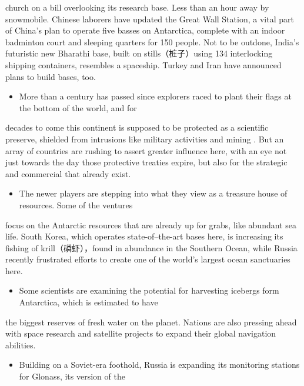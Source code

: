 \documentclass[UTF8,11pt]{ctexart}
\begin{document}
church on a bill overlooking its research base. Less than an hour away by snowmobile. Chinese laborers have updated the Great Wall Station, a vital part of China’s plan to operate five basses on Antarctica, complete with an indoor badminton court and sleeping quarters for 150 people. Not to be outdone, India’s futuristic new Bharathi base, built on stills（桩子）using 134 interlocking shipping containers, resembles a spaceship. Turkey and Iran have announced plans to build bases, too.


\begin{itemize}[leftmargin=2em,itemsep=.2em,topsep=.4em]\item[B.] More than a century has passed since explorers raced to plant their flags at the bottom of the world, and for
\end{itemize}

decades to come this continent is supposed to be protected as a scientific preserve, shielded from intrusions like military activities and mining . But an array of countries are rushing to assert greater influence here, with an eye not just towards the day those protective treaties expire, but also for the strategic and commercial that already exist.


\begin{itemize}[leftmargin=2em,itemsep=.2em,topsep=.4em]\item[C.] The newer players are stepping into what they view as a treasure house of resources. Some of the ventures
\end{itemize}

focus on the Antarctic resources that are already up for grabs, like abundant sea life. South Korea, which operates state-of–the-art bases here, is increasing its fishing of krill（磷虾），found in abundance in the Southern Ocean, while Russia recently frustrated efforts to create one of the world’s largest ocean sanctuaries here.


\begin{itemize}[leftmargin=2em,itemsep=.2em,topsep=.4em]\item[D.] Some scientists are examining the potential for harvesting icebergs form Antarctica, which is estimated to have
\end{itemize}

the biggest reserves of fresh water on the planet. Nations are also pressing ahead with space research and satellite projects to expand their global navigation abilities.


\begin{itemize}[leftmargin=2em,itemsep=.2em,topsep=.4em]\item[E.] Building on a Soviet-era foothold, Russia is expanding its monitoring stations for Glonass, its version of the
\end{itemize}
\end{document}
